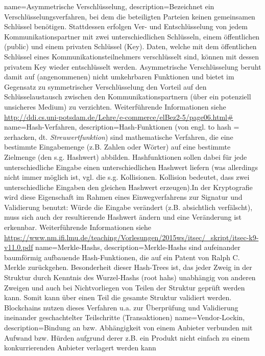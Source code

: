 {
    name=Asymmetrische Verschlüsselung,
    description={Bezeichnet ein Verschlüsselungsverfahren, bei dem die beteiligten Parteien keinen gemeinsamen Schlüssel benötigen. Stattdessen erfolgen Ver- und Entschlüsselung von jedem Kommunikationspartner mit zwei unterschiedlichen Schlüsseln, einem öffentlichen (public) und einem privaten Schlüssel (Key). Daten, welche mit dem öffentlichen Schlüssel eines Kommunikationsteilnehmers verschlüsselt sind, können mit dessen privatem Key wieder entschlüsselt werden. Asymmetrische Verschlüsselung beruht damit auf (angenommenen) nicht umkehrbaren Funktionen und bietet im Gegensatz zu symmetrischer Verschlüsselung den Vorteil auf den Schlüsselaustausch zwischen den Kommunikationspartnern (über ein potenziell unsicheres Medium) zu verzichten. Weiterführende Informationen siehe \url{http://ddi.cs.uni-potsdam.de/Lehre/e-commerce/elBez2-5/page06.html\#}}
}
{
    name=Hash-Verfahren,
    description={Hash-Funktionen (von engl. \glqq{}to hash\grqq{} = zerhacken, dt. \textit{Streuwertfunktion}) sind mathematische Verfahren, die eine bestimmte Eingabemenge (z.B. Zahlen oder Wörter) auf eine bestimmte Zielmenge (den s.g. Hashwert) abbilden. Hashfunktionen sollen dabei für jede unterschiedliche Eingabe einen unterschiedlichen Hashwert liefern (was allerdings nicht immer möglich ist, vgl. die s.g. Kollisionen. Kollision bedeutet, dass zwei unterschiedliche Eingaben den gleichen Hashwert erzeugen).In der Kryptografie wird diese Eigenschaft im Rahmen eines Einwegverfahrens zur Signatur und Validierung benutzt: Würde die Eingabe verändert (z.B. absichtlich verfälscht), muss sich auch der resultierende Hashwert ändern und eine Veränderung ist erkennbar. Weiterführende Informationen siehe \url{https://www.nm.ifi.lmu.de/teaching/Vorlesungen/2015ws/itsec/_skript/itsec-k9-v11.0.pdf}}
}
{
    name=Merkle-Hashs,
    description={Merkle-Hashs sind aufeinander baumförmig aufbauende Hash-Funktionen, die auf ein Patent von Ralph C. Merkle zurückgehen. Besonderheit dieser \glqq{}Hash-Trees\grqq{} ist, das jeder Zweig in der Struktur durch Kenntnis des Wurzel-Hashs (\glqq{}root hahs\grqq{}) unabhängig von anderen Zweigen und auch bei Nichtvorliegen von Teilen der Struktur geprüft werden kann. Somit kann über einen Teil die gesamte Struktur validiert werden. Blockchains nutzen dieses Verfahren u.a. zur Überprüfung und Validierung ineinander geschachtelter Teilschritte (Transaktionen)}
}
{
    name=Vendor-Lockin,
    description={Bindung an bzw. Abhängigkeit von einem Anbieter verbunden mit Aufwand bzw. Hürden aufgrund derer z.B. ein Produkt nicht einfach zu einem konkurrierenden Anbieter verlagert werden kann}
}
